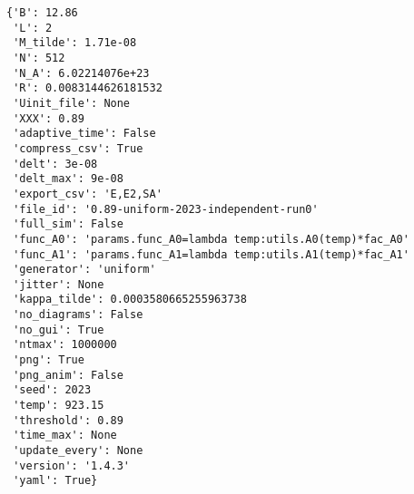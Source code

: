 \documentclass{scrartcl}\usepackage{graphicx,booktabs,pgf}\newcommand{\randA}{\widetilde{A}}
\begin{document}
\begin{verbatim}{'B': 12.86
 'L': 2
 'M_tilde': 1.71e-08
 'N': 512
 'N_A': 6.02214076e+23
 'R': 0.0083144626181532
 'Uinit_file': None
 'XXX': 0.89
 'adaptive_time': False
 'compress_csv': True
 'delt': 3e-08
 'delt_max': 9e-08
 'export_csv': 'E,E2,SA'
 'file_id': '0.89-uniform-2023-independent-run0'
 'full_sim': False
 'func_A0': 'params.func_A0=lambda temp:utils.A0(temp)*fac_A0'
 'func_A1': 'params.func_A1=lambda temp:utils.A1(temp)*fac_A1'
 'generator': 'uniform'
 'jitter': None
 'kappa_tilde': 0.0003580665255963738
 'no_diagrams': False
 'no_gui': True
 'ntmax': 1000000
 'png': True
 'png_anim': False
 'seed': 2023
 'temp': 923.15
 'threshold': 0.89
 'time_max': None
 'update_every': None
 'version': '1.4.3'
 'yaml': True}\end{verbatim}
\end{document}
